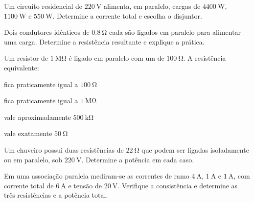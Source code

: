 \begin{questao}[2]{}

Um circuito residencial de $\SI{220}{\volt}$ alimenta, em paralelo, cargas de
$\SI{4400}{\watt}$, $\SI{1100}{\watt}$ e $\SI{550}{\watt}$. Determine a
corrente total e escolha o disjuntor.


\end{questao}
\begin{questao}[2]{}

Dois condutores idênticos de $\SI{0.8}{\ohm}$ cada são ligados em paralelo para
alimentar uma carga. Determine a resistência resultante e explique a prática.


\end{questao}
\begin{questao}[2]{}

Um resistor de $\SI{1}{\mega\ohm}$ é ligado em paralelo com um de
$\SI{100}{\ohm}$. A resistência equivalente:
\begin{alternativas}[2]
\item fica praticamente igual a $\SI{100}{\ohm}$
\item fica praticamente igual a $\SI{1}{\mega\ohm}$
\item vale aproximadamente $\SI{500}{\kilo\ohm}$
\item vale exatamente $\SI{50}{\ohm}$
\end{alternativas}


\end{questao}
\begin{questao}[2]{}

Um chuveiro possui duas resistências de $\SI{22}{\ohm}$ que podem ser ligadas
isoladamente ou em paralelo, sob $\SI{220}{\volt}$. Determine a potência em
cada caso.


\end{questao}
\begin{questao}[2]{}

Em uma associação paralela mediram-se as correntes de ramo $\SI{4}{\ampere}$,
$\SI{1}{\ampere}$ e $\SI{1}{\ampere}$, com corrente total de
$\SI{6}{\ampere}$ e tensão de $\SI{20}{\volt}$. Verifique a consistência e
determine as três resistências e a potência total.


\end{questao}

